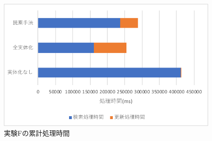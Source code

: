 \documentclass[a4paper,11pt]{ujreport}
\begin{document}
\begin{figure}[htbp]
	\begin{center}
		\includegraphics[width=30em]{src/ExperimentF-total.pdf} %
	\end{center}
	\caption{実験Fの累計処理時間}
	\label{figure:ExperimentF-total}
\end{figure}
\end{document}
